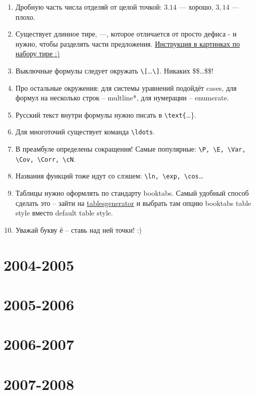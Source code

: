 \documentclass[12pt, a4paper]{article}
\newcommand{\cN}{\mathcal{N}}
\begin{document}
\begin{enumerate}

\item Дробную часть числа отделяй от целой точкой: $3.14$ — хорошо, $3{,}14$ — плохо.
\item Существует длинное тире, —, которое отличается от просто дефиса - и нужно, чтобы разделять части предложения. \href{https://ru.wikihow.com/напечатать-тире}{Инструкция в картинках по набору тире :)}
\item Выключные формулы следует окружать \verb|\[|\ldots\verb|\]|. Никаких \$\$\ldots\$\$!
\item Про остальные окружения: для системы уравнений подойдёт cases, для формул на несколько строк – multline*, для нумерации – enumerate.
\item Русский текст внутри формулы нужно писать в \verb|\text{|\ldots\}.
\item Для многоточий существует команда \verb|\ldots|.
\item В преамбуле определены сокращения! Самые популярные: \verb|\P, \E, \Var, \Cov, \Corr, \cN|.
\item Названия функций тоже идут со слэшем: \verb|\ln, \exp, \cos|\ldots
\item Таблицы нужно оформлять по стандарту booktabs. Самый удобный способ сделать это – зайти на
\href{https://www.tablesgenerator.com}{tablesgenerator} и выбрать там опцию booktabs table style вместо default table style.
\item Уважай букву ё – ставь над ней точки! :)
\end{enumerate}


\section{2004-2005}



\section{2005-2006}



\section{2006-2007}



\section{2007-2008}
\end{document}

